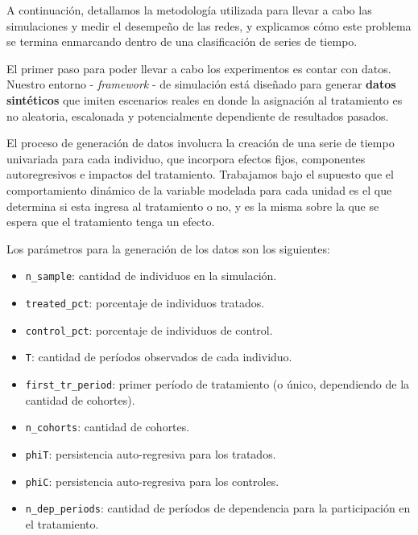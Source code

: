 \documentclass[../main.tex]{subfiles}
\begin{document}
A continuación, detallamos la metodología utilizada para llevar a cabo las simulaciones y
medir el desempeño de las redes, y explicamos cómo este problema se termina enmarcando
dentro de una clasificación de series de tiempo.

El primer paso para poder llevar a cabo los experimentos es contar con datos. Nuestro
entorno - \textit{framework} - de simulación está diseñado para generar \textbf{datos
sintéticos} que imiten escenarios reales en donde la asignación al tratamiento es no
aleatoria, escalonada y potencialmente dependiente de resultados pasados.

El proceso de generación de datos involucra la creación de una serie de tiempo univariada
para cada individuo, que incorpora efectos fijos, componentes autoregresivos e impactos
del tratamiento. Trabajamos bajo el supuesto que el comportamiento dinámico de la variable
modelada para cada unidad es el que determina si esta ingresa al tratamiento o no, y es la
misma sobre la que se espera que el tratamiento tenga un efecto.

Los parámetros para la generación de los datos son los siguientes:
\begin{itemize}
    \setlength{\itemsep}{0pt}
    \item \texttt{n\_sample}: cantidad de individuos en la simulación.
    \item \texttt{treated\_pct}: porcentaje de individuos tratados.
    \item \texttt{control\_pct}: porcentaje de individuos de control.
    \item \texttt{T}: cantidad de períodos observados de cada individuo.
    \item \texttt{first\_tr\_period}: primer período de tratamiento (o único, dependiendo
    de la cantidad de cohortes).
    \item \texttt{n\_cohorts}: cantidad de cohortes.
    \item \texttt{phiT}: persistencia auto-regresiva para los tratados.
    \item \texttt{phiC}: persistencia auto-regresiva para los controles.
    \item \texttt{n\_dep\_periods}: cantidad de períodos de dependencia para la
    participación en el tratamiento.
\end{itemize}
\end{document}
